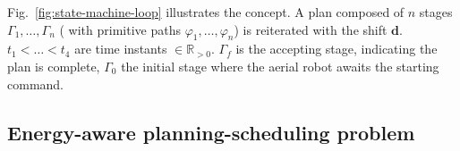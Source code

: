 \documentclass[letterpaper,10pt,journal,twoside]{IEEEtran}
\theoremstyle{definition}
\begin{document}

Fig.~\ref{fig:state-machine-loop} illustrates the concept. %
A plan composed of $n$ stages $\Gamma_1,\dots,\Gamma_n$ (%
{\color{blue}with }primitive paths $\varphi_1,\dots,\varphi_n$) is reiterated with the shift $\mathbf{d}$. $t_1<\dots<t_4$ are time instants $\in\mathbb{R}_{> 0}$. $\Gamma_f$ is the accepting stage, indicating the plan is complete, $\Gamma_0$ the initial stage where the aerial robot awaits the starting command.

\vspace*{-.7ex}
\subsection{Energy-aware planning-scheduling problem}
\label{sec:pbfor}
\end{document}
